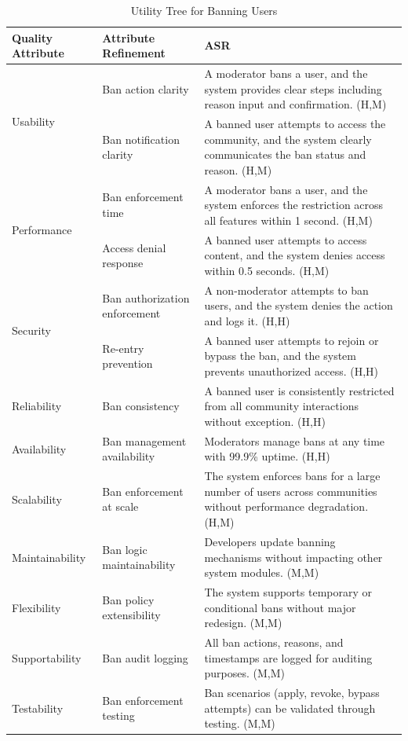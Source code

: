 \documentclass{article}
\begin{document}
\begin{table}[H]
\centering
\caption{Utility Tree for Banning Users}
\begin{tabular}{|p{3cm}|p{4cm}|p{7cm}|}
\hline
\textbf{Quality Attribute} & \textbf{Attribute Refinement} & \textbf{ASR} \\
\hline

\multirow{2}{*}{Usability}
& Ban action clarity
& A moderator bans a user, and the system provides clear steps including reason input and confirmation. (H,M) \\
\cline{2-3}
& Ban notification clarity
& A banned user attempts to access the community, and the system clearly communicates the ban status and reason. (H,M) \\
\hline

\multirow{2}{*}{Performance}
& Ban enforcement time
& A moderator bans a user, and the system enforces the restriction across all features within 1 second. (H,M) \\
\cline{2-3}
& Access denial response
& A banned user attempts to access content, and the system denies access within 0.5 seconds. (H,M) \\
\hline

\multirow{2}{*}{Security}
& Ban authorization enforcement
& A non-moderator attempts to ban users, and the system denies the action and logs it. (H,H) \\
\cline{2-3}
& Re-entry prevention
& A banned user attempts to rejoin or bypass the ban, and the system prevents unauthorized access. (H,H) \\
\hline

Reliability
& Ban consistency
& A banned user is consistently restricted from all community interactions without exception. (H,H) \\
\hline

Availability
& Ban management availability
& Moderators manage bans at any time with 99.9\% uptime. (H,H) \\
\hline

Scalability
& Ban enforcement at scale
& The system enforces bans for a large number of users across communities without performance degradation. (H,M) \\
\hline

Maintainability
& Ban logic maintainability
& Developers update banning mechanisms without impacting other system modules. (M,M) \\
\hline

Flexibility
& Ban policy extensibility
& The system supports temporary or conditional bans without major redesign. (M,M) \\
\hline

Supportability
& Ban audit logging
& All ban actions, reasons, and timestamps are logged for auditing purposes. (M,M) \\
\hline

Testability
& Ban enforcement testing
& Ban scenarios (apply, revoke, bypass attempts) can be validated through testing. (M,M) \\
\hline

\end{tabular}
\end{table}
\end{document}
